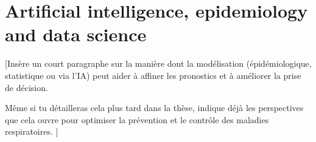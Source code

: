 


\clearpage 


\section{Artificial intelligence, epidemiology and data science}

[Insère un court paragraphe sur la manière dont la modélisation (épidémiologique, statistique ou via l’IA) peut aider à affiner les pronostics et à améliorer la prise de décision.

Même si tu détailleras cela plus tard dans la thèse, indique déjà les perspectives que cela ouvre pour optimiser la prévention et le contrôle des maladies respiratoires. ]

